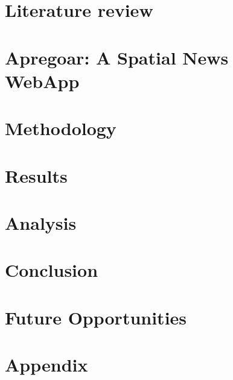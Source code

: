 \documentclass[11pt,usenames,dvipsnames]{article} %
\begin{document}
\section{Literature review}  \label{sec:lit_review}


\section{Apregoar: A Spatial News WebApp} \label{sec:proj_desc}


\section{Methodology} \label{sec:methodology}


\section{Results}
\section{Analysis}

\section{Conclusion}

\section{Future Opportunities}









\newpage
{\footnotesize
	
	 \label{sec:bibliography}
}

\newpage
\section*{Appendix}  \label{sec:appendices}
\begin{appendices}
	
\end{appendices}
\end{document}
